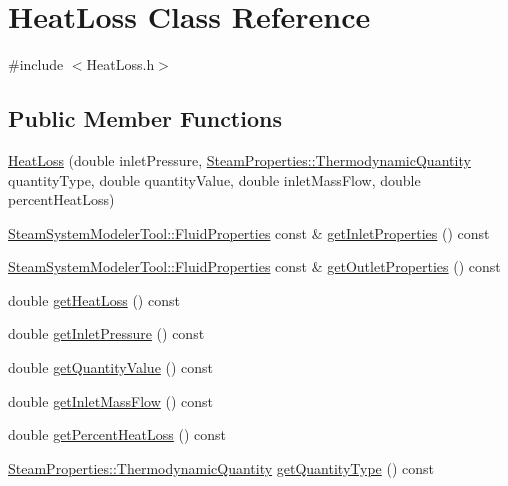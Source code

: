 \hypertarget{class_heat_loss}{}\section{Heat\+Loss Class Reference}
\label{class_heat_loss}


{\ttfamily \#include $<$Heat\+Loss.\+h$>$}

\subsection*{Public Member Functions}
\begin{DoxyCompactItemize}
\item 
\hyperlink{class_heat_loss_a1c1bba4ef783d97e2ed63f39f625e82f}{Heat\+Loss} (double inlet\+Pressure, \hyperlink{class_steam_properties_ae0294bedf7d178c2d8fb6aed0f62fbff}{Steam\+Properties\+::\+Thermodynamic\+Quantity} quantity\+Type, double quantity\+Value, double inlet\+Mass\+Flow, double percent\+Heat\+Loss)
\item 
\hyperlink{struct_steam_system_modeler_tool_1_1_fluid_properties}{Steam\+System\+Modeler\+Tool\+::\+Fluid\+Properties} const  \& \hyperlink{class_heat_loss_a7bea461460dbacf1855d5375bbf6c097}{get\+Inlet\+Properties} () const
\item 
\hyperlink{struct_steam_system_modeler_tool_1_1_fluid_properties}{Steam\+System\+Modeler\+Tool\+::\+Fluid\+Properties} const  \& \hyperlink{class_heat_loss_a3e483dda6f393d67d7a0f28bcd75e545}{get\+Outlet\+Properties} () const
\item 
double \hyperlink{class_heat_loss_acc39533782f4f5cbf902d36f7bfc53b0}{get\+Heat\+Loss} () const
\item 
double \hyperlink{class_heat_loss_a09e6e05477fd6794ea7f42bb43da2f50}{get\+Inlet\+Pressure} () const
\item 
double \hyperlink{class_heat_loss_a7f7fd85e4fc8bf96dcc213f3dd44ecf7}{get\+Quantity\+Value} () const
\item 
double \hyperlink{class_heat_loss_ad11a428f99a4945628f66adecb88bf5a}{get\+Inlet\+Mass\+Flow} () const
\item 
double \hyperlink{class_heat_loss_acbbf01db5cde157057e4d766cab22382}{get\+Percent\+Heat\+Loss} () const
\item 
\hyperlink{class_steam_properties_ae0294bedf7d178c2d8fb6aed0f62fbff}{Steam\+Properties\+::\+Thermodynamic\+Quantity} \hyperlink{class_heat_loss_a92dc973c0fd81df192207b3df55d6c2b}{get\+Quantity\+Type} () const
\item 

\end{DoxyCompactItemize}
